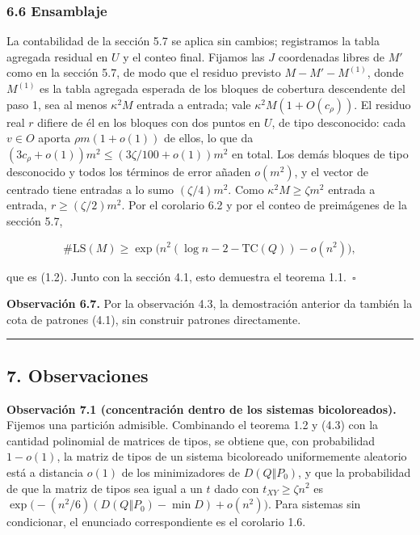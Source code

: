 \documentclass[spanish,11pt,a4paper]{article}
\begin{document}
\subsubsection{6.6 Ensamblaje}\label{ensamblaje}

La contabilidad de la sección 5.7 se aplica sin cambios; registramos la tabla agregada residual en \(U\) y el conteo final. Fijamos las \(J\) coordenadas libres de \(M'\) como en la sección 5.7, de modo que el residuo previsto \(M-M'-M^{(1)}\), donde \(M^{(1)}\) es la tabla agregada esperada de los bloques de cobertura descendente del paso 1, sea al menos \(\kappa^2M\) entrada a entrada; vale \(\kappa^2M(1+O(c_\rho))\). El residuo real \(r\) difiere de él en los bloques con dos puntos en \(U\), de tipo desconocido: cada \(v\in O\) aporta \(\rho m(1+o(1))\) de ellos, lo que da \((3c_\rho+o(1))m^2\le(3\zeta/100+o(1))m^2\) en total. Los demás bloques de tipo desconocido y todos los términos de error añaden \(o(m^2)\), y el vector de centrado tiene entradas a lo sumo \((\zeta/4)m^2\). Como \(\kappa^2M\ge\zeta m^2\) entrada a entrada, \(r\ge(\zeta/2)m^2\). Por el corolario 6.2 y por el conteo de preimágenes de la sección 5.7,

\nopagebreak[4]
\[\#\mathrm{LS}(M)\ge\exp\bigl(n^2(\log n-2-\mathrm{TC}(Q))-o(n^2)\bigr),\]

que es (1.2). Junto con la sección 4.1, esto demuestra el teorema 1.1.~\(\square\)

\textbf{Observación 6.7.} Por la observación 4.3, la demostración anterior da también la cota de patrones (4.1), sin construir patrones directamente.

\begin{center}\rule{0.5\linewidth}{0.5pt}\end{center}

\subsection{7. Observaciones}\label{observaciones}

\textbf{Observación 7.1 (concentración dentro de los sistemas bicoloreados).} Fijemos una partición admisible. Combinando el teorema 1.2 y (4.3) con la cantidad polinomial de matrices de tipos, se obtiene que, con probabilidad \(1-o(1)\), la matriz de tipos de un sistema bicoloreado uniformemente aleatorio está a distancia \(o(1)\) de los minimizadores de \(D(Q\Vert P_0)\), y que la probabilidad de que la matriz de tipos sea igual a un \(t\) dado con \(t_{XY}\ge\zeta n^2\) es \(\exp\bigl(-(n^2/6)(D(Q\Vert P_0)-\min D)+o(n^2)\bigr)\). Para sistemas sin condicionar, el enunciado correspondiente es el corolario 1.6.
\end{document}
